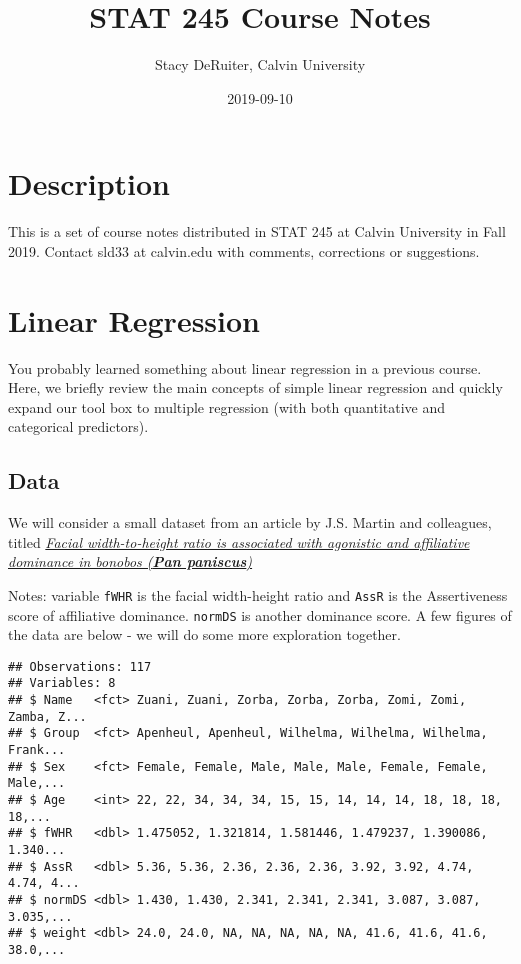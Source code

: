 \documentclass[]{book}
\title{STAT 245 Course Notes}
\author{Stacy DeRuiter, Calvin University}
\date{2019-09-10}
\begin{document}
\maketitle

{
\setcounter{tocdepth}{1}
\tableofcontents
}
\hypertarget{description}{%
\chapter{Description}\label{description}}

This is a set of course notes distributed in STAT 245 at Calvin University in Fall 2019. Contact sld33 at calvin.edu with comments, corrections or suggestions.

\hypertarget{linear-regression}{%
\chapter{Linear Regression}\label{linear-regression}}

You probably learned something about linear regression in a previous course. Here, we briefly review the main concepts of simple linear regression and quickly expand our tool box to multiple regression (with both quantitative and categorical predictors).

\hypertarget{data}{%
\section{Data}\label{data}}

We will consider a small dataset from an article by J.S. Martin and colleagues, titled \href{https://royalsocietypublishing.org/doi/suppl/10.1098/rsbl.2019.0232}{\emph{Facial width-to-height ratio is associated with agonistic and affiliative dominance in bonobos (\textbf{Pan paniscus})}}

Notes: variable \texttt{fWHR} is the facial width-height ratio and \texttt{AssR} is the Assertiveness score of affiliative dominance. \texttt{normDS} is another dominance score. A few figures of the data are below - we will do some more exploration together.

\begin{verbatim}
## Observations: 117
## Variables: 8
## $ Name   <fct> Zuani, Zuani, Zorba, Zorba, Zorba, Zomi, Zomi, Zamba, Z...
## $ Group  <fct> Apenheul, Apenheul, Wilhelma, Wilhelma, Wilhelma, Frank...
## $ Sex    <fct> Female, Female, Male, Male, Male, Female, Female, Male,...
## $ Age    <int> 22, 22, 34, 34, 34, 15, 15, 14, 14, 14, 18, 18, 18, 18,...
## $ fWHR   <dbl> 1.475052, 1.321814, 1.581446, 1.479237, 1.390086, 1.340...
## $ AssR   <dbl> 5.36, 5.36, 2.36, 2.36, 2.36, 3.92, 3.92, 4.74, 4.74, 4...
## $ normDS <dbl> 1.430, 1.430, 2.341, 2.341, 2.341, 3.087, 3.087, 3.035,...
## $ weight <dbl> 24.0, 24.0, NA, NA, NA, NA, NA, 41.6, 41.6, 41.6, 38.0,...
\end{verbatim}
\end{document}
